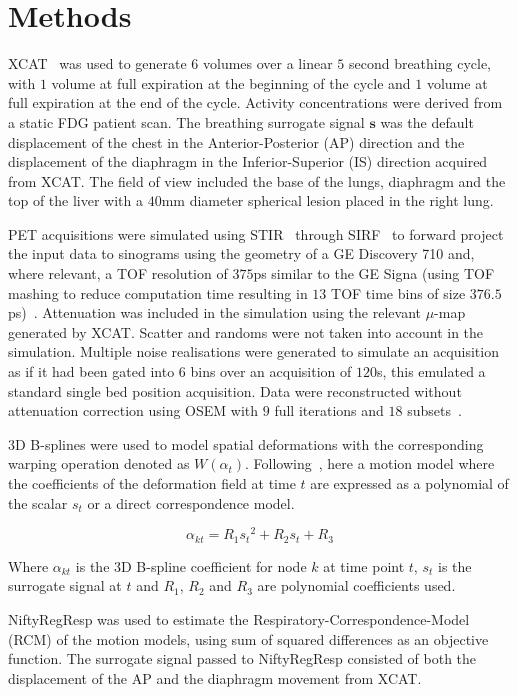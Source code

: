 \documentclass{IEEEtran}
\begin{document}
\section{Methods}
XCAT~\cite{Segars2010} was used to generate $6$ volumes over a linear $5$ second breathing cycle, with $1$ volume at full expiration at the beginning of the cycle and $1$ volume at full expiration at the end of the cycle. Activity concentrations were derived from a static FDG patient scan. The breathing surrogate signal $\bm{s}$ was the default displacement of the chest in the Anterior-Posterior (AP) direction and the displacement of the diaphragm in the Inferior-Superior (IS) direction acquired from XCAT. The field of view included the base of the lungs, diaphragm and the top of the liver with a $40$mm diameter spherical lesion placed in the right lung.

PET acquisitions were simulated using STIR~\cite{Thielemans2012} through SIRF~\cite{Ovtchinnikov2017} to forward project the input data to sinograms using the geometry of a GE Discovery 710 and, where relevant, a TOF resolution of $375$ps similar to the GE Signa (using TOF mashing to reduce computation time resulting in $13$ TOF time bins of size $376.5$ps)~\cite{Efthimiou2018}. Attenuation was included in the simulation using the relevant $\mu$-map generated by XCAT. Scatter and randoms were not taken into account in the simulation. Multiple noise realisations were generated to simulate an acquisition as if it had been gated into $6$ bins over an acquisition of $120$s, this emulated a standard single bed position acquisition. Data were reconstructed without attenuation correction using OSEM with $9$ full iterations and $18$ subsets~\cite{Hudson1994}. 

3D B-splines were used to model spatial deformations with the corresponding warping operation denoted as $W(\alpha_t)$. Following~\cite{McClelland2013}, here a motion model where the coefficients of the deformation field at time $t$ are expressed as a polynomial of the scalar $s_t$ or a direct correspondence model.

\begin{equation}
    \alpha_{kt} = R_1 {s_t}^2 + R_2 s_t + R_3
\end{equation}

\noindent Where $\alpha_{kt}$ is the 3D B-spline coefficient for node $k$ at time point $t$, $s_t$ is the surrogate signal at $t$ and $R_1$, $R_2$ and $R_3$ are polynomial coefficients used. 

NiftyRegResp was used to estimate the Respiratory-Correspondence-Model (RCM) of the motion models, using sum of squared differences as an objective function. The surrogate signal passed to NiftyRegResp consisted of both the displacement of the AP and the  diaphragm movement from XCAT.
\end{document}
